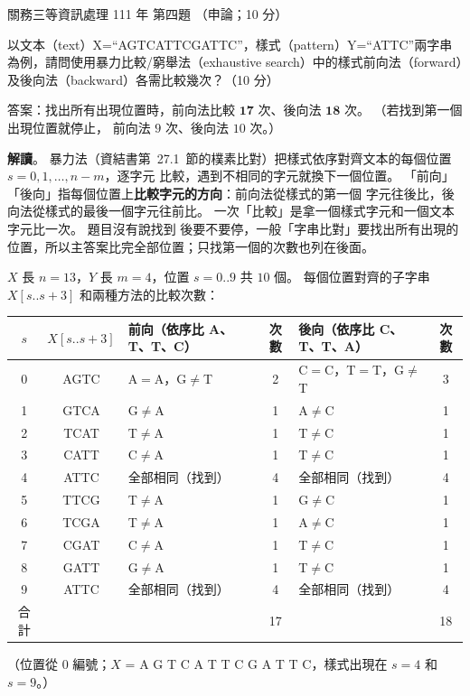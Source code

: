 \begin{pastexam}[label={px:gw3-111-ds-04}]{關務三等資訊處理 111 年 第四題}
（申論；10 分）

以文本（text）X=“AGTCATTCGATTC”，樣式（pattern）Y=“ATTC”兩字串為例，請問使用暴力比較/窮舉法（exhaustive
search）中的樣式前向法（forward）及後向法（backward）各需比較幾次？（10 分）
\end{pastexam}

\begin{pastsoln}
答案：找出所有出現位置時，前向法比較 $\mathbf{17}$ 次、後向法 $\mathbf{18}$ 次。 （若找到第一個出現位置就停止，
前向法 $9$ 次、後向法 $10$ 次。）

\textbf{解讀}。 暴力法（資結書第~27.1~節的樸素比對）把樣式依序對齊文本的每個位置 $s = 0, 1, \ldots, n - m$，逐字元
比較，遇到不相同的字元就換下一個位置。 「前向」「後向」指每個位置上\textbf{比較字元的方向}：前向法從樣式的第一個
字元往後比，後向法從樣式的最後一個字元往前比。 一次「比較」是拿一個樣式字元和一個文本字元比一次。 題目沒有說找到
後要不要停，一般「字串比對」要找出所有出現的位置，所以主答案比完全部位置；只找第一個的次數也列在後面。

$X$ 長 $n = 13$，$Y$ 長 $m = 4$，位置 $s = 0..9$ 共 $10$ 個。 每個位置對齊的子字串 $X[s..s+3]$ 和兩種方法的比較次數：
\begin{center}
\small
\begin{tabular}{cclclc}
\toprule
$s$ & $X[s..s+3]$ & 前向（依序比 A、T、T、C） & 次數 & 後向（依序比 C、T、T、A） & 次數 \\
\midrule
0 & AGTC & A$=$A，G$\ne$T & 2 & C$=$C，T$=$T，G$\ne$T & 3 \\
1 & GTCA & G$\ne$A & 1 & A$\ne$C & 1 \\
2 & TCAT & T$\ne$A & 1 & T$\ne$C & 1 \\
3 & CATT & C$\ne$A & 1 & T$\ne$C & 1 \\
4 & ATTC & 全部相同（找到） & 4 & 全部相同（找到） & 4 \\
5 & TTCG & T$\ne$A & 1 & G$\ne$C & 1 \\
6 & TCGA & T$\ne$A & 1 & A$\ne$C & 1 \\
7 & CGAT & C$\ne$A & 1 & T$\ne$C & 1 \\
8 & GATT & G$\ne$A & 1 & T$\ne$C & 1 \\
9 & ATTC & 全部相同（找到） & 4 & 全部相同（找到） & 4 \\
\midrule
合計 & & & 17 & & 18 \\
\bottomrule
\end{tabular}
\end{center}
（位置從 $0$ 編號；$X$ = A G T C A T T C G A T T C，樣式出現在 $s = 4$ 和 $s = 9$。）


\end{pastsoln}
